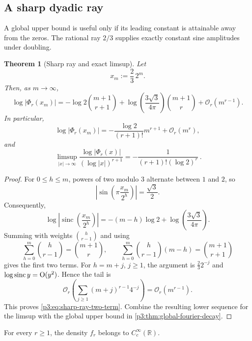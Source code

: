 \documentclass[11pt,oneside]{article}
\newtheorem{theorem}{Theorem}[section]
\theoremstyle{definition}
\theoremstyle{remark}
\newcommand{\R}{\mathbb R}
\newcommand{\sinc}{\operatorname{sinc}}
\newcommand{\bigO}{\mathcal O}
\begin{document}
\subsection{A sharp dyadic ray}

A global upper bound is useful only if its leading constant is attainable away from the zeros.  The rational ray $2/3$ supplies exactly constant sine amplitudes under doubling.

\begin{theorem}[Sharp ray and exact limsup]\label{p3:thm:sharp-ray}
Let
\begin{equation}\label{p3:eq:sharp-ray}
  x_m:=\frac23\,2^m.
\end{equation}
Then, as $m\to\infty$,
\begin{equation}\label{p3:eq:sharp-ray-two-term}
 \log|\Phi_r(x_m)|
 =-\log2\binom{m+1}{r+1}
 +\log\!\left(\frac{3\sqrt3}{4\pi}\right)
  \binom{m+1}{r}
 +\bigO_r(m^{r-1}).
\end{equation}
In particular,
\begin{equation}\label{p3:eq:sharp-ray-leading}
 \log|\Phi_r(x_m)|
 =-\frac{\log2}{(r+1)!}m^{r+1}+\bigO_r(m^r),
\end{equation}
and
\begin{equation}\label{p3:eq:fourier-limsup}
 \boxed{\ 
 \limsup_{|x|\to\infty}
 \frac{\log|\Phi_r(x)|}{(\log|x|)^{r+1}}
 =-\frac1{(r+1)!(\log2)^r}
 \ }.
\end{equation}
\end{theorem}

\begin{proof}
For $0\le h\le m$, powers of two modulo $3$ alternate between $1$ and $2$, so
\[
 \left|\sin\!\left(\pi\frac{x_m}{2^h}\right)\right|
 =\frac{\sqrt3}{2}.
\]
Consequently,
\[
 \log\left|\sinc\!\left(\frac{x_m}{2^h}\right)\right|
 =-(m-h)\log2+\log\!\left(\frac{3\sqrt3}{4\pi}\right).
\]
Summing with weights $\binom h{r-1}$ and using
\[
 \sum_{h=0}^{m}\binom h{r-1}=\binom{m+1}{r},
 \qquad
 \sum_{h=0}^{m}\binom h{r-1}(m-h)=\binom{m+1}{r+1}
\]
gives the first two terms.  For $h=m+j$, $j\ge1$, the argument is $\frac23 2^{-j}$ and
$\log\sinc y=\bigOPartl(y^2)$.  Hence the tail is
\[
 \bigO_r\!\left(\sum_{j\ge1}(m+j)^{r-1}4^{-j}\right)
 =\bigO_r(m^{r-1}).
\]
This proves \eqref{p3:eq:sharp-ray-two-term}.  Combine the resulting lower sequence for the limsup with the global upper bound in \cref{p3:thm:global-fourier-decay}.
\end{proof}

\begin{corollary}\label{p3:cor:smooth-density}
For every $r\ge1$, the density $f_r$ belongs to $C_c^\infty(\R)$.
\end{corollary}
\end{document}
